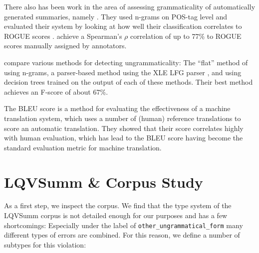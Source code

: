 \documentclass[a4paper,10pt]{scrartcl}
\theoremstyle{style}
\begin{document}
There also has been work in the area of assessing grammaticality of automatically generated summaries, namely \cite{vadlapudi2010automated}. They used n-grams on POS-tag level and evaluated their system by looking at how well their classification correlates to ROGUE scores \citep{lin2004rouge}. \citeauthor{vadlapudi2010automated} achieve a Spearman's $\rho{}$ correlation of up to 77\% to ROGUE scores manually assigned by annotators.

\cite{wagner2007comparative} compare various methods for detecting ungrammaticality: The ``flat'' method of using n-grams, a parser-based method using the XLE LFG parser \citep{maxwell1996efficient}, and using decision trees trained on the output of each of these methods. Their best method achieves an F-score of about 67\%.

The BLEU score \citep{papineni2002bleu} is a method for evaluating the effectiveness of a machine translation system, which uses a number of (human) reference translations to score an automatic translation. They showed that their score correlates highly with human evaluation, which has lead to the BLEU score having become the standard evaluation metric for machine translation.

\section{LQVSumm \& Corpus Study}
\label{corpus_study}

As a first step, we inspect the corpus. We find that the type system of the LQVSumm corpus \citep{valeeva} is not detailed enough for our purposes and has a few shortcomings: Especially under the label of \texttt{other\_ungrammatical\_form} many different types of errors are combined. For this reason, we define a number of subtypes for this violation:
\end{document}
